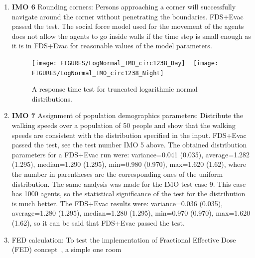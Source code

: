 \documentclass[12pt,a4paper,final,twoside]{stylevk}
\begin{document}
\begin{enumerate}
  constants $\tau_i$, and the initial positions.  This test is a
  little bit odd, because there is only 10 agents in the simulation so
  one can not get out any good statistics.  But one could see that
  each agent is starting accordingly to its randomly generated
  response time (both the response time and coordinates of the agent
  are printed out).  To test better the random distribution
  properties, the IMO test case 9 was used, where there are 1000
  agents.  Two different response time distributions were used, the
  day and night case ones of the IMO document~\cite{IMO07}.  These are
  both truncated logarithmic normal distributions.  The results of
  these tests are given in Fig.~\ref{Fig_IMOLogNormal}
%
\item \textbf{IMO 6} Rounding corners: Persons approaching a corner will
  successfully navigate around the corner without penetrating the
  boundaries.  FDS+Evac passed the test.  The social force model used
  for the movement of the agents does not allow the agents to go
  inside walls if the time step is small enough as it is in FDS+Evac
  for reasonable values of the model parameters.
%
\begin{figure}[!tb]
  \centerline{\texttt{[image: FIGURES/LogNormal\_IMO\_circ1238\_Day]} ~  
  \texttt{[image: FIGURES/LogNormal\_IMO\_circ1238\_Night]}}   
  \caption{A response time test for truncated logarithmic normal
  distributions.}\label{Fig_IMOLogNormal} 
\end{figure}
%
%
\item \textbf{IMO 7} Assignment of population demographics parameters:
  Distribute the walking speeds over a population of 50 people and
  show that the walking speeds are consistent with the distribution
  specified in the input.  FDS+Evac passed the test, see the test
  number IMO 5 above.  The obtained distribution parameters for a
  FDS+Evac run were: variance=0.041 (0.035), average=1.282 (1.295),
  median=1.290 (1.295), min=0.980 (0.970), max=1.620 (1.62), where the
  number in parentheses are the corresponding ones of the uniform
  distribution.  The same analysis was made for the IMO test case 9.
  This case has 1000 agents, so the statistical significance of the
  test for the distribution is much better.  The FDS+Evac results
  were: variance=0.036 (0.035), average=1.280 (1.295), median=1.280
  (1.295), min=0.970 (0.970), max=1.620 (1.62), so it can be said that
  FDS+Evac passed the test.
%
\item FED calculation: To test the implementation of Fractional
  Effective Dose (FED) concept~\cite{Purser03}, a simple one room

\end{enumerate}
\end{document}
